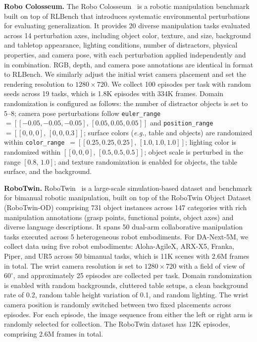 \documentclass{llmxive}
\providecommand{\dataset}{DA-Next-5M\xspace}
\begin{document}
\textbf{Robo Colosseum.}
The Robo Colosseum~\citep{pumacay2024colosseum} is a robotic manipulation benchmark built on top of RLBench that introduces systematic environmental perturbations for evaluating generalization.
%
It provides 20 diverse manipulation tasks evaluated across 14 perturbation axes, including object color, texture, and size, background and tabletop appearance, lighting conditions, number of distractors, physical properties, and camera pose, with each perturbation applied independently and in combination.
%
RGB, depth, and camera pose annotations are identical in format to RLBench.
%
We similarly adjust the initial wrist camera placement and set the rendering resolution 
to $1280 \times 720$. 
%
We collect 100 episodes per task with random seeds across 19 tasks, which is 1.8K episodes with 334K frames.
%
Domain randomization is configured as follows: the number of distractor objects is set to 5--8; camera pose perturbations follow  \texttt{euler\_range}~$= [[-0.05,-0.05,-0.05],\,[0.05,0.05,0.05]]$ and \texttt{position\_range}~$= [[0,0,0],\,[0,0,0.3]]$; surface colors (\emph{e.g.}, table and objects) are randomized within \texttt{color\_range}~$= [[0.25,0.25,0.25],\,[1.0,1.0,1.0]]$; lighting color is randomized within $[[0,0,0],\,[0.5,0.5,0.5]]$; object scale is perturbed in the range $[0.8,\,1.0]$; and texture randomization is enabled for objects, the table surface, and the background.

\textbf{RoboTwin.}
RoboTwin~\citep{chen2025robotwin} is a large-scale simulation-based dataset and benchmark for bimanual robotic manipulation, built on top of the RoboTwin Object Dataset (RoboTwin-OD) comprising 731 object instances across 147 categories with rich manipulation annotations (grasp points, functional points, object axes) and diverse language descriptions.
%
It spans 50 dual-arm collaborative manipulation tasks executed across 5 heterogeneous robot embodiments.
%
For \dataset, we collect data using five robot embodiments: Aloha-AgileX, ARX-X5, Franka, Piper, and UR5 across 50 bimanual tasks, which is 11K scenes with 2.6M frames in total.
%
The wrist camera resolution is set to $1280 \times 720$ with a field of view of $60^\circ$, and approximately 25 episodes are collected per task. 
%
Domain randomization is enabled with random backgrounds, cluttered table setups, a clean background rate of 0.2, random table height variation of 0.1, and random lighting. 
%
The wrist camera position is randomly switched between two fixed placements across episodes. For each episode, the image sequence from either the left or right arm is randomly selected for collection.
%
The RoboTwin dataset has 12K episodes, comprising 2.6M frames in total.
\end{document}
